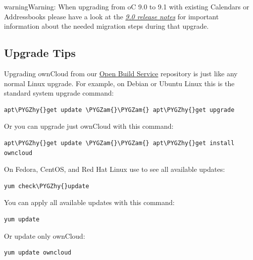 \documentclass[letterpaper,10pt,english]{sphinxmanual}
\def\PYGZam{\char`\&}
\def\PYGZhy{\char`\-}
\begin{document}
\begin{notice}{warning}{Warning:}
When upgrading from oC 9.0 to 9.1 with existing Calendars or Addressbooks
please have a look at the {\hyperref[release_notes:release-notes-label]{\emph{9.0 release notes}}} for
important information about the needed migration steps during that upgrade.
\end{notice}


\subsection{Upgrade Tips}
\label{maintenance/package_upgrade:upgrade-tips}
Upgrading ownCloud from our \href{https://download.owncloud.org/download/repositories/stable/owncloud/}{Open Build Service} repository is just like any
normal Linux upgrade. For example, on Debian or Ubuntu Linux this is the
standard system upgrade command:

\begin{Verbatim}[commandchars=\\\{\}]
apt\PYGZhy{}get update \PYGZam{}\PYGZam{} apt\PYGZhy{}get upgrade
\end{Verbatim}

Or you can upgrade just ownCloud with this command:

\begin{Verbatim}[commandchars=\\\{\}]
apt\PYGZhy{}get update \PYGZam{}\PYGZam{} apt\PYGZhy{}get install owncloud
\end{Verbatim}

On Fedora, CentOS, and Red Hat Linux use  to see all available updates:

\begin{Verbatim}[commandchars=\\\{\}]
yum check\PYGZhy{}update
\end{Verbatim}

You can apply all available updates with this command:

\begin{Verbatim}[commandchars=\\\{\}]
yum update
\end{Verbatim}

Or update only ownCloud:

\begin{Verbatim}[commandchars=\\\{\}]
yum update owncloud
\end{Verbatim}
\end{document}
